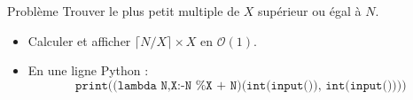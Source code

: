 \begin{frame}
    \frametitle{\problemtitle}
    \begin{block}{Problème}
        Trouver le plus petit multiple de $X$ supérieur ou égal à $N$.
    \end{block}
    \pause
    \begin{itemize}[<+->]
        \item Calculer et afficher $\lceil N/X \rceil \times X$ en $\mathcal{O}(1)$.
        \item En une ligne Python :
        \[
        \texttt{print((lambda N,X:-N \% X + N)(int(input()), int(input())))}
        \]
    \end{itemize}

\end{frame}